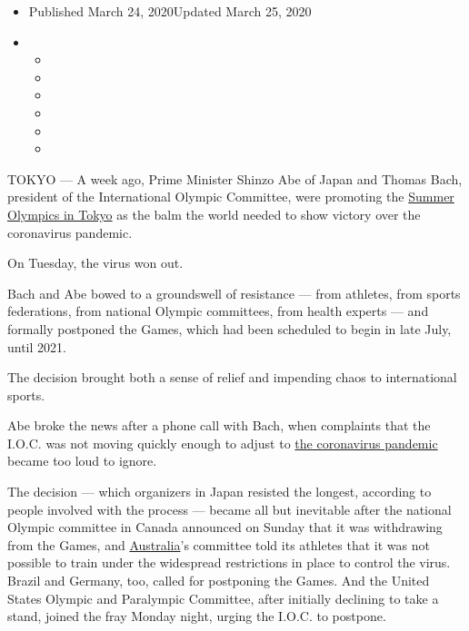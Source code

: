 \begin{itemize}
\item
  Published March 24, 2020Updated March 25, 2020
\item
  \begin{itemize}
  \item
  \item
  \item
  \item
  \item
  \item
  \end{itemize}
\end{itemize}

TOKYO --- A week ago, Prime Minister Shinzo Abe of Japan and Thomas
Bach, president of the International Olympic Committee, were promoting
the
\href{https://www.nytimes3xbfgragh.onion/2020/07/19/sports/2021-tokyo-olympics-protocols.html}{Summer
Olympics in Tokyo} as the balm the world needed to show victory over the
coronavirus pandemic.

On Tuesday, the virus won out.

Bach and Abe bowed to a groundswell of resistance --- from athletes,
from sports federations, from national Olympic committees, from health
experts --- and formally postponed the Games, which had been scheduled
to begin in late July, until 2021.

The decision brought both a sense of relief and impending chaos to
international sports.

Abe broke the news after a phone call with Bach, when complaints that
the I.O.C. was not moving quickly enough to adjust to
\href{https://www.nytimes3xbfgragh.onion/2020/03/24/world/coronavirus-updates-maps.html?action=click\&pgtype=Article\&state=default\&module=styln-coronavirus\&variant=show\&region=TOP_BANNER\&context=storyline_menu}{the
coronavirus pandemic} became too loud to ignore.

The decision --- which organizers in Japan resisted the longest,
according to people involved with the process --- became all but
inevitable after the national Olympic committee in Canada announced on
Sunday that it was withdrawing from the Games, and
\href{https://twitter.com/CBCOlympics/status/1242121430554165249?s=20}{Australia}'s
committee told its athletes that it was not possible to train under the
widespread restrictions in place to control the virus. Brazil and
Germany, too, called for postponing the Games. And the United States
Olympic and Paralympic Committee, after initially declining to take a
stand, joined the fray Monday night, urging the I.O.C. to postpone.

